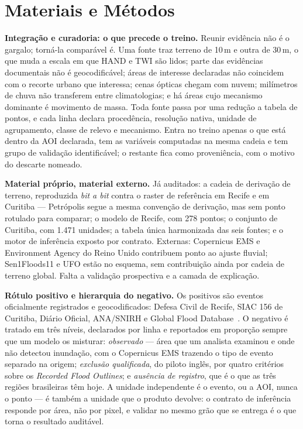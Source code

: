 \documentclass[conference]{IEEEtran}
\begin{document}
\section{Materiais e Métodos}

\textbf{Integração e curadoria: o que precede o treino.} Reunir evidência não é o
gargalo; torná-la comparável é. Uma fonte traz terreno de 10\,m e outra de 30\,m,
o que muda a escala em que HAND e TWI são lidos; parte das evidências documentais
não é geocodificável; áreas de interesse declaradas não coincidem com o recorte
urbano que interessa; cenas ópticas chegam com nuvem; milímetros de chuva não
transferem entre climatologias; e há áreas cujo mecanismo dominante é movimento
de massa. Toda fonte passa por uma
redução a tabela de pontos, e cada linha declara procedência, resolução nativa,
unidade de agrupamento, classe de relevo e mecanismo. Entra no treino apenas o
que está dentro da AOI declarada, tem as variáveis computadas na mesma cadeia e
tem grupo de validação identificável; o restante fica como proveniência, com o
motivo do descarte nomeado.

\textbf{Material próprio, material externo.} Já auditados: a cadeia de derivação
de terreno, reproduzida \emph{bit a bit} contra o raster de referência em Recife
e em Curitiba --- Petrópolis segue a mesma convenção de derivação, mas sem ponto
rotulado para comparar; o modelo de Recife, com 278 pontos; o conjunto de
Curitiba, com 1.471 unidades; a tabela única harmonizada das seis fontes; e o
motor de inferência exposto por contrato. Externas: Copernicus EMS e Environment
Agency do Reino Unido contribuem ponto ao ajuste fluvial; Sen1Floods11 e UFO
estão no esquema, sem contribuição ainda por cadeia de terreno global. Falta a
validação prospectiva e a camada de explicação.

\textbf{Rótulo positivo e hierarquia do negativo.} Os positivos são eventos
oficialmente registrados e geocodificados: Defesa Civil de Recife, SIAC 156 de
Curitiba, Diário Oficial, ANA/SNIRH e Global Flood Database~\cite{tellman2021}. O
negativo é tratado em três níveis, declarados por linha e reportados em proporção
sempre que um modelo os misturar: \emph{observado} --- área que um analista
examinou e onde não detectou inundação, com o Copernicus EMS trazendo o tipo de
evento separado na origem; \emph{exclusão qualificada}, do piloto inglês, por
quatro critérios sobre os \emph{Recorded Flood Outlines}; e \emph{ausência de
registro}, que é o que as três regiões brasileiras têm hoje. A unidade
independente é o evento, ou a AOI, nunca o ponto --- é também a unidade que o
produto devolve: o contrato de inferência responde por área, não por pixel, e
validar no mesmo grão que se entrega é o que torna o resultado auditável.
\end{document}
